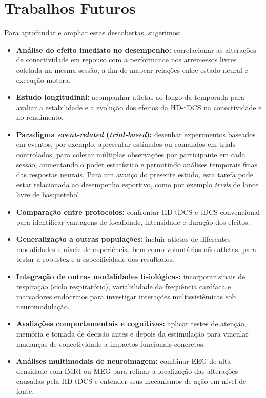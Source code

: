 \section{Trabalhos Futuros}
Para aprofundar e ampliar estas descobertas, sugerimos:
\begin{itemize}
  \item \textbf{Análise do efeito imediato no desempenho:} correlacionar as alterações de conectividade em repouso com a performance nos arremessos livres coletada na mesma sessão, a fim de mapear relações entre estado neural e execução motora.
  \item \textbf{Estudo longitudinal:} acompanhar atletas ao longo da temporada para avaliar a estabilidade e a evolução dos efeitos da HD-tDCS na conectividade e no rendimento.
  \item \textbf{Paradigma \textit{event‑related} (\textit{trial‑based}):} desenhar experimentos baseados em eventos, por exemplo, apresentar estímulos ou comandos em trials controlados, para coletar múltiplas observações por participante em cada sessão, aumentando o poder estatístico e permitindo análises temporais finas das respostas neurais. Para um avanço do presente estudo, esta tarefa pode estar relacionada ao desempenho esportivo, como por exemplo \textit{trials} de lance livre de basquetebol.
  \item \textbf{Comparação entre protocolos:} confrontar HD-tDCS e tDCS convencional para identificar vantagens de focalidade, intensidade e duração dos efeitos.
  \item \textbf{Generalização a outras populações:} incluir atletas de diferentes modalidades e níveis de experiência, bem como voluntários não atletas, para testar a robustez e a especificidade dos resultados.
  \item \textbf{Integração de outras modalidades fisiológicas:} incorporar sinais de respiração (ciclo respiratório), variabilidade da frequência cardíaca e marcadores endócrinos para investigar interações multissistêmicas sob neuromodulação.
  \item \textbf{Avaliações comportamentais e cognitivas:} aplicar testes de atenção, memória e tomada de decisão antes e depois da estimulação para vincular mudanças de conectividade a impactos funcionais concretos.
  \item \textbf{Análises multimodais de neuroimagem:} combinar EEG de alta densidade com fMRI ou MEG para refinar a localização das alterações causadas pela HD-tDCS e entender seus mecanismos de ação em nível de fonte.
\end{itemize}
